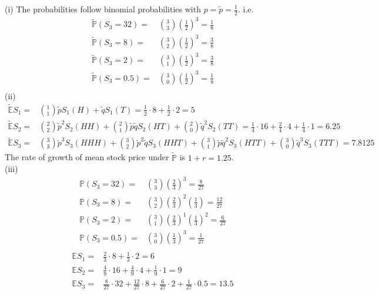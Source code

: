 \documentclass[12pt]{article}
\newenvironment{problem}[2][Problem]{\begin{trivlist}
		\item[\hskip \labelsep {\bfseries #1}\hskip \labelsep {\bfseries #2.}]}{\end{trivlist}}
\begin{document}
	\begin{problem}{2}\end{problem}
	(i) The probabilities follow binomial probabilities with $p=\tilde{p} = \frac{1}{2}$. i.e.
	\begin{align*}
	\tilde{\mathbb{P}}(S_3 = 32) =& {3\choose 3}\left(\frac{1}{2}\right)^3=\frac{1}{8}\\
	\tilde{\mathbb{P}}(S_3 = 8) =& {3\choose 2}\left(\frac{1}{2}\right)^3=\frac{3}{8}\\
	\tilde{\mathbb{P}}(S_3 = 2) =& {3\choose 1}\left(\frac{1}{2}\right)^3=\frac{3}{8}\\
	\tilde{\mathbb{P}}(S_3 = 0.5) =& {3\choose 0}\left(\frac{1}{2}\right)^3=\frac{1}{8}\\
	\end{align*}
	(ii) \begin{align*}
	\tilde{\mathbb{E}}S_1 =&{1\choose 1} \tilde{p}S_1(H)+\tilde{q}S_1(T) = \frac{1}{2}\cdot 8 +\frac{1}{2}\cdot 2 = 5\\
	\tilde{\mathbb{E}}S_2 =& {2\choose 2}\tilde{p}^2S_2(HH)+{2\choose 1}\tilde{p}\tilde{q}S_2(HT) + {2\choose 0}\tilde{q}^2 S_2(TT) = \frac{1}{4}\cdot 16 + \frac{2}{4}\cdot 4 +\frac{1}{4}\cdot 1 = 6.25\\
	\tilde{\mathbb{E}}S_3 =& {3\choose 3}\tilde{p}^3S_3(HHH)+{3\choose 2}\tilde{p}^2\tilde{q}S_3(HHT)+{3\choose 1}\tilde{p}\tilde{q}^2 S_3(HTT)+{3\choose 0}\tilde{q}^3S_3(TTT) = 7.8125
	\end{align*}
	The rate of growth of mean stock price under $\tilde{\mathbb{P}}$ is $1+r = 1.25$. \\
	(iii) \begin{align*}
	\mathbb{P}(S_3 = 32) =& {3\choose 3}\left(\frac{2}{3}\right)^3=\frac{8}{27}\\
	\mathbb{P}(S_3 = 8) =& {3\choose 2}\left(\frac{2}{3}\right)^2\left(\frac{1}{3}\right)=\frac{12}{27}\\
	\mathbb{P}(S_3 = 2) =& {3\choose 1}\left(\frac{2}{3}\right)^1\left(\frac{1}{3}\right)^2=\frac{6}{27}\\
	\mathbb{P}(S_3 = 0.5) =& {3\choose 0}\left(\frac{1}{3}\right)^3=\frac{1}{27}\\
	\end{align*}
	\begin{align*}
	\mathbb{E}S_1 =& \frac{2}{3}\cdot 8 +\frac{1}{3}\cdot 2 = 6\\
	\mathbb{E}S_2 =& \frac{4}{9}\cdot 16 + \frac{4}{9}\cdot 4 +\frac{1}{9}\cdot 1 = 9\\
	\mathbb{E}S_3 =& \frac{8}{27}\cdot 32 + \frac{12}{27}\cdot 8 + \frac{6}{27}\cdot 2 + \frac{1}{27}\cdot 0.5 = 13.5
	\end{align*}
\end{document}
